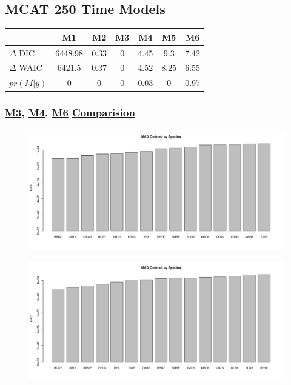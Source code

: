 \documentclass[12pt]{article}
\begin{document}
\subsection{MCAT 250 Time Models}	
	\begin{table}[ht!]
	\centering
	\begin{tabular}[c]{@{}lcccccc@{}}
	\hline
	& M1 & M2 & M3 & M4 & M5 & M6 \\ \hline
	\(\Delta\) DIC & 6448.98 & 0.33 & 0 & 4.45 & 9.3 & 7.42 \\
	\(\Delta\) WAIC & 6421.5 & 0.37 & 0 & 4.52 & 8.25 & 6.55 \\
	\(pr(M|y)\) & 0 & 0 & 0 & 0.03 & 0 & 0.97
	\end{tabular}
	\end{table}

\subsubsection{\href{https://github.com/gasduster99/sppComp/tree/master/sscRuns/25019781982M3}{M3}, \href{https://github.com/gasduster99/sppComp/tree/master/sscRuns/25019781982M4}{M4}, \href{https://github.com/gasduster99/sppComp/tree/master/sscRuns/25019781982M6}{M6} \href{https://github.com/gasduster99/sppComp/tree/master/try1/postSSC/25019781982M3M4M6}{Comparision}}
	\begin{figure}[ht!]
	\centering
	\includegraphics[width=.6\textwidth]{../sscRuns/25019781982M3/sppMad68.pdf}
	\end{figure}

	\begin{figure}[ht!]
        \centering
        \includegraphics[width=.6\textwidth]{../sscRuns/25019781982M4/sppMad68.pdf}
        \end{figure}
	
\end{document}

